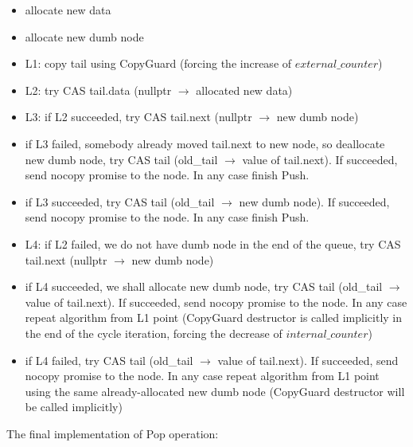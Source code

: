 \documentclass{article}
\begin{document}
\begin{itemize}
	\item allocate new data
	\item allocate new dumb node
	\item L1: copy tail using CopyGuard (forcing the increase of $external\_counter$)
	\item L2: try CAS tail.data (nullptr $\rightarrow$ allocated new data)
	\item L3: if L2 succeeded, try CAS tail.next (nullptr $\rightarrow$ new dumb node)
	\item if L3 failed, somebody already moved tail.next to new node, so deallocate new dumb node, try CAS tail (old\_tail $\rightarrow$ value of tail.next). If succeeded, send nocopy promise to the node. In any case finish Push.
	\item if L3 succeeded, try CAS tail (old\_tail $\rightarrow$ new dumb node). If succeeded, send nocopy promise to the node. In any case finish Push.
	\item L4: if L2 failed, we do not have dumb node in the end of the queue, try CAS tail.next (nullptr $\rightarrow$ new dumb node)
	\item if L4 succeeded, we shall allocate new dumb node, try CAS tail (old\_tail $\rightarrow$ value of tail.next). If succeeded, send nocopy promise to the node. In any case repeat algorithm from L1 point (CopyGuard destructor is called implicitly in the end of the cycle iteration, forcing the decrease of $internal\_counter$)
	\item if L4 failed, try CAS tail (old\_tail $\rightarrow$ value of tail.next). If succeeded, send nocopy promise to the node. In any case repeat algorithm from L1 point using the same already-allocated new dumb node (CopyGuard destructor will be called implicitly)
\end{itemize}

The final implementation of Pop operation:
\end{document}
